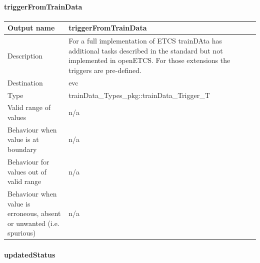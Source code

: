 \paragraph{triggerFromTrainData}

\begin{longtable}{p{}p{}}
\toprule
Output name				& triggerFromTrainData \\
\midrule
Description				& For a full implementation of ETCS trainDAta has additional tasks described in the standard but not implemented in openETCS. For those extensions the triggers are pre-defined. \\
\midrule
Destination				& evc \\ 
\midrule
Type					& trainData\_Types\_pkg::trainData\_Trigger\_T
 \\
\midrule
Valid range of values	& n/a \\
\midrule
Behaviour when value is at boundary	& n/a\\
\midrule
Behaviour for values out of valid range	& n/a \\
\midrule
Behaviour when value is erroneous, absent or unwanted (i.e. spurious) & n/a\\
\bottomrule
\end{longtable}

\paragraph{updatedStatus}


